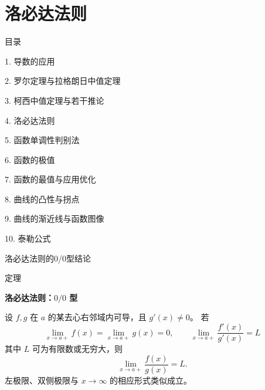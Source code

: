 \documentclass[aspectratio=169,10pt,fontset=fandol]{ctexbeamer}
\begin{document}
\section{洛必达法则}
\begin{frame}[t,fragile]{目录}
\normalsize
{\color{black}\normalsize 1. 导数的应用\par}\vspace{0.22em}
{\color{black}\normalsize 2. 罗尔定理与拉格朗日中值定理\par}\vspace{0.22em}
{\color{black}\normalsize 3. 柯西中值定理与若干推论\par}\vspace{0.22em}
{\color{blue}\normalsize 4. 洛必达法则\par}\vspace{0.22em}
{\color{gray!40}\normalsize 5. 函数单调性判别法\par}\vspace{0.22em}
{\color{gray!40}\normalsize 6. 函数的极值\par}\vspace{0.22em}
{\color{gray!40}\normalsize 7. 函数的最值与应用优化\par}\vspace{0.22em}
{\color{gray!40}\normalsize 8. 曲线的凸性与拐点\par}\vspace{0.22em}
{\color{gray!40}\normalsize 9. 曲线的渐近线与函数图像\par}\vspace{0.22em}
{\color{gray!40}\normalsize 10. 泰勒公式\par}\vspace{0.22em}
\end{frame}
\begin{frame}[t,fragile]{洛必达法则的0/0型结论}
\footnotesize
\begin{block}{定理}
{\footnotesize
\textbf{洛必达法则：$0/0$ 型}\par

设 $f,g$ 在 $a$ 的某去心右邻域内可导，且 $g'(x)\neq0$。 若
\[
\lim_{x\to a+}f(x)=\lim_{x\to a+}g(x)=0,\qquad
\lim_{x\to a+}\frac{f'(x)}{g'(x)}=L
\]
其中 $L$ 可为有限数或无穷大，则
\[
\lim_{x\to a+}\frac{f(x)}{g(x)}=L.
\]
左极限、双侧极限与 $x\to\infty$ 的相应形式类似成立。

}
\end{block}
\end{frame}
\end{document}
